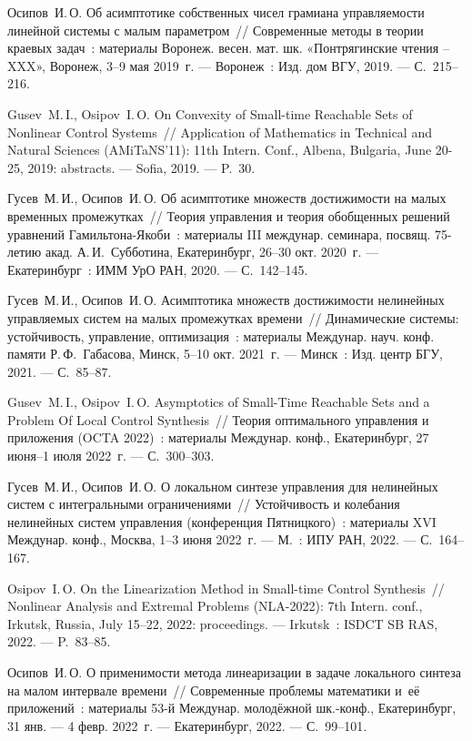 \documentclass[../main.tex]{subfiles}
\begin{document}
\begin{thebibliography}{99}
Осипов~И.\,О. Об асимптотике собственных чисел грамиана управляемости линейной системы с малым параметром~// Современные методы в теории краевых задач~: материалы Воронеж. весен. мат. шк. «Понтрягинские чтения – XXX», Воронеж, 3--9 мая 2019~г. --- Воронеж~: Изд. дом ВГУ, 2019. --- С.~215--216.

Gusev~M.\,I., Osipov~I.\,O. On Convexity of Small-time Reachable Sets of Nonlinear Control Systems~// Application of Mathematics in Technical and Natural Sciences (AMiTaNS'11): 11th Intern. Conf., Albena, Bulgaria, June 20-25, 2019: abstracts. --- Sofia, 2019. --- P.~30.

Гусев~М.\,И., Осипов~И.\,О. Об асимптотике множеств достижимости на малых временных промежутках~// Теория управления и теория обобщенных решений уравнений Гамильтона-Якоби~: материалы III междунар. семинара, посвящ. 75-летию акад. А.\,И.~Субботина, Екатеринбург, 26--30 окт. 2020~г. --- Екатеринбург~: ИММ УрО РАН, 2020. --- С.~142--145.


Гусев~М.\,И., Осипов~И.\,О. Асимптотика множеств достижимости нелинейных управляемых систем на малых промежутках времени~// Динамические системы: устойчивость, управление, оптимизация~: материалы Междунар. науч. конф. памяти Р.\,Ф.~Габасова, Минск, 5--10 окт. 2021~г. --- Минск~: Изд. центр БГУ, 2021. --- С.~85--87. 

Gusev~M.\,I., Osipov~I.\,O. Asymptotics of Small-Time Reachable Sets and a Problem Of Local Control Synthesis~// Теория оптимального управления и приложения (OCTA 2022)~: материалы Междунар. конф., Екатеринбург, 27 июня–1 июля 2022~г. --- С.~300--303.

Гусев~М.\,И., Осипов~И.\,О. О локальном синтезе управления для нелинейных систем с интегральными ограничениями~// Устойчивость и колебания нелинейных систем управления (конференция Пятницкого)~: материалы XVI Междунар. конф., Москва, 1--3 июня 2022~г. --- М.~: ИПУ РАН, 2022. --- С.~164--167.

Osipov~I.\,O. On the Linearization Method in Small-time Control Synthesis~// Nonlinear Analysis and Extremal Problems (NLA-2022): 7th Intern. conf., Irkutsk, Russia, July 15–22, 2022: proceedings. --- Irkutsk~: ISDCT SB RAS, 2022. --- P.~83--85.

Осипов~И.\,О. О применимости метода линеаризации в задаче локального синтеза на малом интервале времени~// Современные проблемы математики и~её приложений~: материалы 53-й Междунар. молодёжной шк.-конф., Екатеринбург, 31 янв. --- 4 февр. 2022~г. --- Екатеринбург, 2022. --- С.~99--101.


\end{thebibliography}
\end{document}
